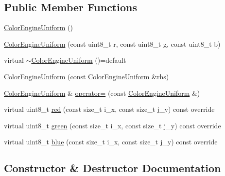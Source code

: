 \subsection*{Public Member Functions}
\begin{DoxyCompactItemize}
\item 
\hyperlink{classGraphicalEditorCore_1_1ColorEngineUniform_a9e76ad9019e3bb878f6250ca57e2f777}{Color\+Engine\+Uniform} ()
\item 
\hyperlink{classGraphicalEditorCore_1_1ColorEngineUniform_aa91a594076b06d41154b68543870b388}{Color\+Engine\+Uniform} (const uint8\+\_\+t r, const uint8\+\_\+t g, const uint8\+\_\+t b)
\item 
virtual \hyperlink{classGraphicalEditorCore_1_1ColorEngineUniform_a0bfdba9e4751b79bdcf9692ad57fde34}{$\sim$\+Color\+Engine\+Uniform} ()=default
\item 
\hyperlink{classGraphicalEditorCore_1_1ColorEngineUniform_a93f61f9e237172ff45434f9b783f3870}{Color\+Engine\+Uniform} (const \hyperlink{classGraphicalEditorCore_1_1ColorEngineUniform}{Color\+Engine\+Uniform} \&rhs)
\item 
\hyperlink{classGraphicalEditorCore_1_1ColorEngineUniform}{Color\+Engine\+Uniform} \& \hyperlink{classGraphicalEditorCore_1_1ColorEngineUniform_a423a6e179cca7d9c81f888b2b0f6cd2a}{operator=} (const \hyperlink{classGraphicalEditorCore_1_1ColorEngineUniform}{Color\+Engine\+Uniform} \&)
\item 
virtual uint8\+\_\+t \hyperlink{classGraphicalEditorCore_1_1ColorEngineUniform_a91461ce9955811e4e5e2f74cd2e9ec94}{red} (const size\+\_\+t i\+\_\+x, const size\+\_\+t j\+\_\+y) const override
\item 
virtual uint8\+\_\+t \hyperlink{classGraphicalEditorCore_1_1ColorEngineUniform_a219f34e3e5dabdf260e7c1adaa8bc2ee}{green} (const size\+\_\+t i\+\_\+x, const size\+\_\+t j\+\_\+y) const override
\item 
virtual uint8\+\_\+t \hyperlink{classGraphicalEditorCore_1_1ColorEngineUniform_ae5d9b3422740f667080f28d22a17830b}{blue} (const size\+\_\+t i\+\_\+x, const size\+\_\+t j\+\_\+y) const override
\end{DoxyCompactItemize}


\subsection{Constructor \& Destructor Documentation}

